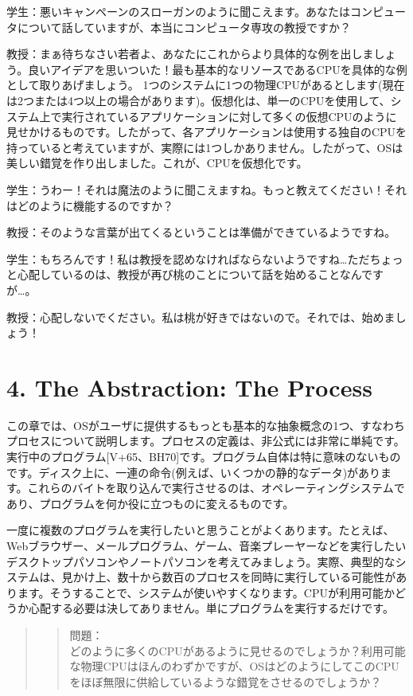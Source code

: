 学生：悪いキャンペーンのスローガンのように聞こえます。あなたはコンピュータについて話していますが、本当にコンピュータ専攻の教授ですか？

教授：まぁ待ちなさい若者よ、あなたにこれからより具体的な例を出しましょう。良いアイデアを思いついた！最も基本的なリソースであるCPUを具体的な例として取りあげましょう。
1つのシステムに1つの物理CPUがあるとします(現在は2つまたは4つ以上の場合があります)。仮想化は、単一のCPUを使用して、システム上で実行されているアプリケーションに対して多くの仮想CPUのように見せかけるものです。したがって、各アプリケーションは使用する独自のCPUを持っていると考えていますが、実際には1つしかありません。したがって、OSは美しい錯覚を作り出しました。これが、CPUを仮想化です。

学生：うわー！それは魔法のように聞こえますね。もっと教えてください！それはどのように機能するのですか？

教授：そのような言葉が出てくるということは準備ができているようですね。

学生：もちろんです！私は教授を認めなければならないようですね\ldots ただちょっと心配しているのは、教授が再び桃のことについて話を始めることなんですが\ldots。

教授：心配しないでください。私は桃が好きではないので。それでは、始めましょう！

\hypertarget{the-abstraction-the-process}{%
\section*{4. The Abstraction: The
Process}\label{the-abstraction-the-process}}

この章では、OSがユーザに提供するもっとも基本的な抽象概念の1つ、すなわちプロセスについて説明します。プロセスの定義は、非公式には非常に単純です。実行中のプログラム{[}V+65、BH70{]}です。プログラム自体は特に意味のないものです。ディスク上に、一連の命令(例えば、いくつかの静的なデータ)があります。これらのバイトを取り込んで実行させるのは、オペレーティングシステムであり、プログラムを何か役に立つものに変えるものです。

一度に複数のプログラムを実行したいと思うことがよくあります。たとえば、Webブラウザー、メールプログラム、ゲーム、音楽プレーヤーなどを実行したいデスクトップパソコンやノートパソコンを考えてみましょう。実際、典型的なシステムは、見かけ上、数十から数百のプロセスを同時に実行している可能性があります。そうすることで、システムが使いやすくなります。CPUが利用可能かどうか心配する必要は決してありません。単にプログラムを実行するだけです。

\begin{quote}
\begin{quote}
問題：\\
どのように多くのCPUがあるように見せるのでしょうか？利用可能な物理CPUはほんのわずかですが、OSはどのようにしてこのCPUをほぼ無限に供給しているような錯覚をさせるのでしょうか？
\end{quote}
\end{quote}

